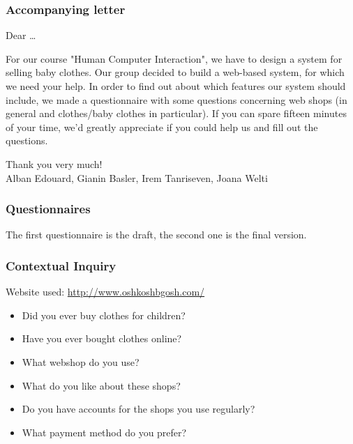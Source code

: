 \subsubsection{Accompanying letter}\label{sec:letter}
Dear \dots

For our course "Human Computer Interaction", we have to design a system for selling baby clothes. Our group decided to build a web-based system, for which we need your help. In order to find out about which features our system should include, we made a questionnaire with some questions concerning web shops (in general and clothes/baby clothes in particular).
If you can spare fifteen minutes of your time, we'd greatly appreciate if you could help us and fill out the questions.

Thank you very much!\\
Alban Edouard, Gianin Basler, Irem Tanriseven, Joana Welti


\subsubsection{Questionnaires}\label{sec:questionnaires}
The first questionnaire is the draft, the second one is the final version.






\subsubsection{Contextual Inquiry}\label{sec:contextual_inquiry}
Website used: \url{http://www.oshkoshbgosh.com/}

\begin{itemize}\addtolength{\itemsep}{-0.5\baselineskip}
 \item Did you ever buy clothes for children?
 \item Have you ever bought clothes online?
 \item What webshop do you use?
 \item What do you like about these shops?
 \item Do you have accounts for the shops you use regularly?
 \item What payment method do you prefer?
\end{itemize}


